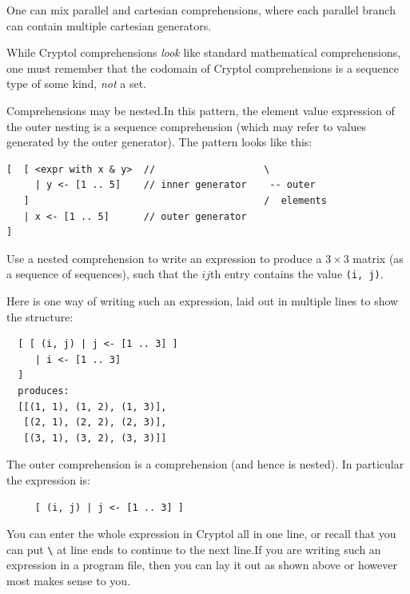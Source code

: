 \begin{tip}
  One can mix parallel and cartesian comprehensions, where each
  parallel branch can contain multiple cartesian
  generators.\indComp\indCartesian\indParallel
\end{tip}

\begin{tip}
  While Cryptol comprehensions \emph{look} like standard mathematical
  comprehensions, one must remember that the codomain of Cryptol
  comprehensions is a sequence type of some kind, \emph{not} a set.
\end{tip}

Comprehensions may be nested.\indNestedComp In this pattern, the
element value expression of the outer nesting is a sequence
comprehension (which may refer to values generated by the outer
generator). The pattern looks like this:

\begin{minipage}{\textwidth}  %
\begin{Verbatim}
[  [ <expr with x & y>  //                   \
     | y <- [1 .. 5]    // inner generator    -- outer
   ]                                         /  elements
   | x <- [1 .. 5]      // outer generator
]
\end{Verbatim}
\end{minipage}

\begin{Exercise}\label{ex:seq:6}
  Use a nested comprehension to write an expression to produce a
  $3\times3$ matrix (as a sequence of sequences), such that the $ij$th
  entry contains the value {\tt (i, j)}.
\end{Exercise}
\begin{Answer}
  Here is one way of writing such an expression, laid out in multiple
  lines to show the structure:
\begin{Verbatim}
  [ [ (i, j) | j <- [1 .. 3] ]
     | i <- [1 .. 3]
  ]
  produces:
  [[(1, 1), (1, 2), (1, 3)],
   [(2, 1), (2, 2), (2, 3)],
   [(3, 1), (3, 2), (3, 3)]]
\end{Verbatim}
The outer comprehension is a comprehension (and hence is nested). In
particular the expression is:
\begin{Verbatim}
     [ (i, j) | j <- [1 .. 3] ]
\end{Verbatim}
You can enter the whole expression in Cryptol all in one line, or
recall that you can put \texttt{\textbackslash} at line ends to continue to
the next line.\indLineCont If you are writing such an expression in a
program file, then you can lay it out as shown above or however most
makes sense to you.
\end{Answer}

